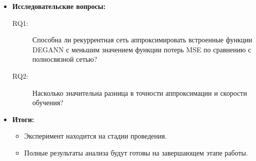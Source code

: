 \documentclass
  [ russian
  , aspectratio=1610 %
  ] {beamer}
\begin{document}
\begin{frame}
    \begin{itemize}
            \item \textbf{Исследовательские вопросы:}
        \begin{description}
            \item[RQ1:] Способна ли рекуррентная сеть аппроксимировать встроенные функции DEGANN с меньшим значением функции потерь MSE по сравнению с полносвязной сетью?
            \item[RQ2:] Насколько значительна разница в точности аппроксимации и скорости обучения?
        \end{description}
        \item \textbf{Итоги:}
        \begin{itemize}
            \item Эксперимент находится на стадии проведения.
            \item Полные результаты анализа будут готовы на завершающем этапе работы.
        \end{itemize}
    \end{itemize}
\end{frame}
\end{document}
